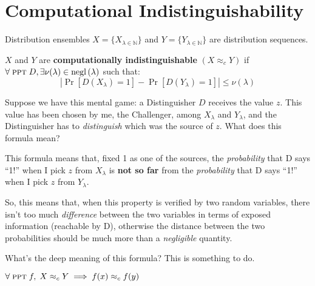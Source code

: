 \section{Computational Indistinguishability}

Distribution ensembles $X = \{X_{\lambda \in \mathbb{N}}\}$ and $Y = \{Y_{\lambda \in \mathbb{N}}\}$ are distribution sequences.

\begin{definition}
    $X$ and $Y$ are \textbf{computationally indistinguishable} $(X \approx_{c} Y)$ if $\forall\; \textsc{ppt}\; D, \exists \nu(\lambda) \in \mathrm{negl}\left({\lambda}\right)$ such that:
    \begin{equation*}
        \left| \Pr[D(X_\lambda) = 1] - \Pr[D(Y_\lambda) = 1] \right| \leq \nu(\lambda) 
    \end{equation*}
\end{definition}


Suppose we have this mental game: a Distinguisher $D$ receives the value $z$. This value has been chosen by me, the Challenger, among $X_{\lambda}$ and $Y_{\lambda}$, and the Distinguisher has to \textit{distinguish} which was the source of $z$. What does this formula mean?

This formula means that, fixed 1 as one of the sources, the \textit{probability} that D says ``1!'' when I pick $z$ from $X_{\lambda}$ is \textbf{not so far} from the \textit{probability} that D says ``1!'' when I pick $z$ from $Y_{\lambda}$.

So, this means that, when this property is verified by two random variables, there isn't too much \textit{difference} between the two variables in terms of exposed information (reachable by D), otherwise the distance between the two probabilities should be much more than a \textit{negligible} quantity.

What's the deep meaning of this formula? This is something to do.

\begin{lemma}\label{lem:tria}
    $\forall\; \textsc{ppt}\; f,\; X \approx_{c} Y \implies f(x) \approx_{c} f(y)$
\end{lemma}


